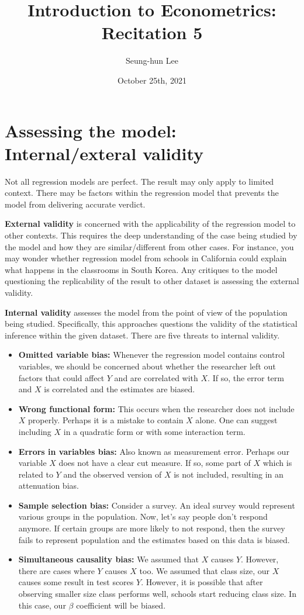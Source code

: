 \documentclass[12pt]{article}
\title{Introduction to Econometrics: Recitation 5}
\theoremstyle{definition}
\theoremstyle{property}
\theoremstyle{assumption}
\theoremstyle{example}
\theoremstyle{comment}
\begin{document}
\linespread{1.25}
\author{Seung-hun Lee}
\date{October 25th, 2021 }
\maketitle

\section{Assessing the model: Internal/exteral validity}
Not all regression models are perfect. The result may only apply to limited context. There may be factors within the regression model that prevents the model from delivering accurate verdict. \par\medskip
\textbf{External validity} is concerned with the applicability of the regression model to other contexts. This requires the deep understanding of the case being studied by the model and how they are similar/different from other cases. For instance, you may wonder whether regression model from schools in California could explain what happens in the classrooms in South Korea. Any critiques to the model questioning the replicability of the result to other dataset is assessing the external validity. \par\medskip
\textbf{Internal validity} assesses the model from the point of view of the population being studied. Specifically, this approaches questions the validity of the statistical inference within the given dataset. There are five threats to internal validity.
\begin{itemize}
\item \textbf{Omitted variable bias: }Whenever the regression model contains control variables, we should be concerned about whether the researcher left out factors that could affect $Y$ and are correlated with $X$. If so, the error term and $X$ is correlated and the estimates are biased. 
\item \textbf{Wrong functional form: }This occurs when the researcher does not include $X$ properly. Perhaps it is a mistake to contain $X$ alone. One can suggest including $X$ in a quadratic form or with some interaction term.  
\item \textbf{Errors in variables bias: }Also known as measurement error. Perhaps our variable $X$ does not have a clear cut measure. If so, some part of $X$ which is related to $Y$ and the observed version of $X$ is not included, resulting in an attenuation bias.
\item \textbf{Sample selection bias: }Consider a survey. An ideal survey would represent various groups in the population. Now, let's say people don't respond anymore. If certain groups are more likely to not respond, then the survey fails to represent population and the estimates based on this data is biased.
\item \textbf{Simultaneous causality bias: }We assumed that $X$ causes $Y$. However, there are cases where $Y$ causes $X$ too.  We assumed that class size,  our $X$ causes some result in test scores $Y$. However, it is possible that after observing smaller size class performs well, schools start reducing class size. In this case, our $\beta$ coefficient will be biased. 
\end{itemize}
\end{document}
